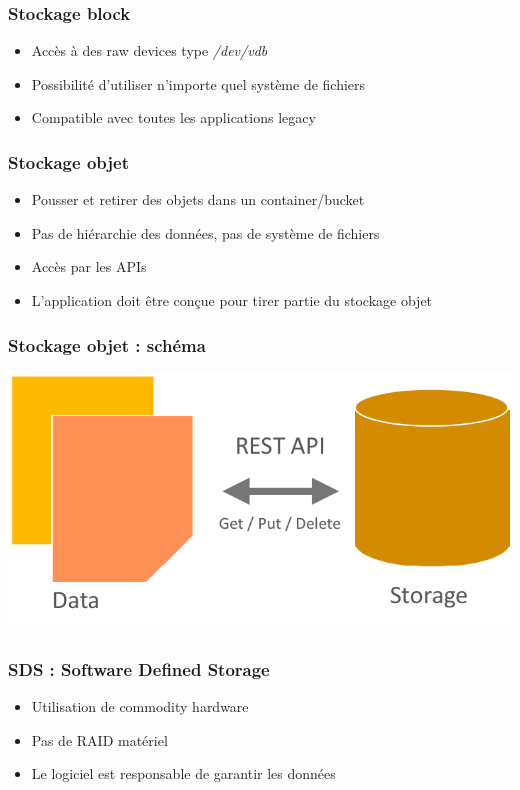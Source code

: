   \begin{frame}
    \frametitle{Stockage block}
    \begin{itemize}
      \item Accès à des raw devices type \textit{/dev/vdb}
      \item Possibilité d'utiliser n'importe quel système de fichiers
      \item Compatible avec toutes les applications legacy
    \end{itemize}
  \end{frame}

  \begin{frame}
    \frametitle{Stockage objet}
    \begin{itemize}
      \item Pousser et retirer des objets dans un container/bucket
      \item Pas de hiérarchie des données, pas de système de fichiers
      \item Accès par les APIs
      \item L'application doit être conçue pour tirer partie du stockage objet
    \end{itemize}
  \end{frame}

  \begin{frame}
    \frametitle{Stockage objet : schéma}
    \begin{center}
      \includegraphics{images/stockage-objet.png}
    \end{center}
  \end{frame}

  \begin{frame}
    \frametitle{SDS : Software Defined Storage}
    \begin{itemize}
      \item Utilisation de commodity hardware
      \item Pas de RAID matériel
      \item Le logiciel est responsable de garantir les données
    \end{itemize}
  \end{frame}

